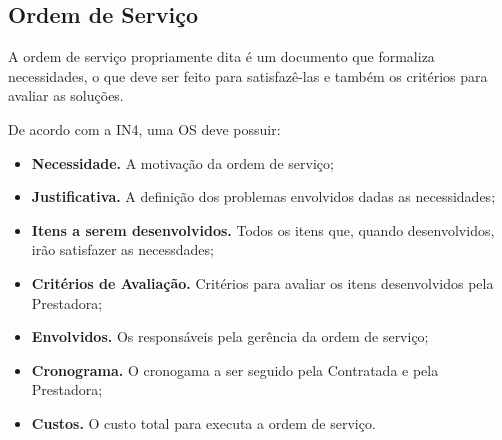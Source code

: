 \subsection{Ordem de Serviço}

A ordem de serviço propriamente dita é um documento que formaliza necessidades,
o que deve ser feito para satisfazê-las e também os critérios para avaliar as
soluções.

De acordo com a IN4, uma OS deve possuir:

\begin{itemize}
  \item \textbf{Necessidade.} A motivação da ordem de serviço;
  \item \textbf{Justificativa.} A definição dos problemas envolvidos dadas as
  necessidades;
  \item \textbf{Itens a serem desenvolvidos.} Todos os itens que, quando
  desenvolvidos, irão satisfazer as necessdades;
  \item \textbf{Critérios de Avaliação.} Critérios para avaliar os itens
  desenvolvidos pela Prestadora;
  \item \textbf{Envolvidos.} Os responsáveis pela gerência da ordem de serviço;
  \item \textbf{Cronograma.} O cronogama a ser seguido pela Contratada e pela
  Prestadora;
  \item \textbf{Custos.} O custo total para executa a ordem de serviço.
\end{itemize}
